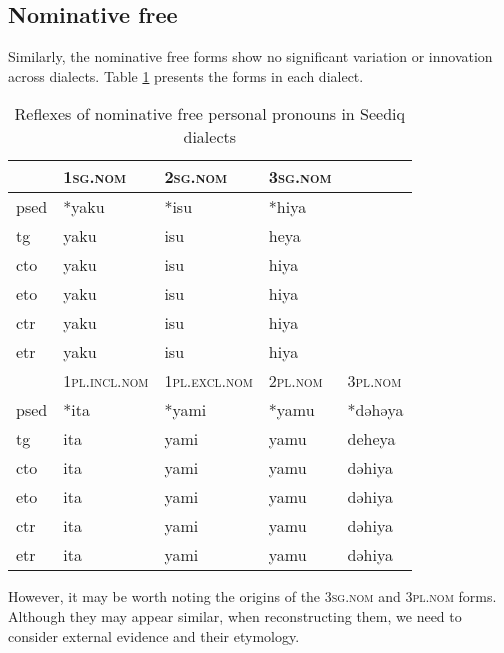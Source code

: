 \subsection{Nominative free}

Similarly, the nominative free forms show no significant variation or innovation across dialects. Table \ref{tab:nomfree} presents the forms in each dialect.

\begin{table}[!htbp]
\centering
\caption{Reflexes of nominative free personal pronouns in Seediq dialects}
\label{tab:nomfree}
\begin{tabular}{lllll}
\hline
      & \textsc{1sg.nom}      & \textsc{2sg.nom}      & \textsc{3sg.nom} &         \\ \hline
\acs{psed} & *yaku        & *isu         & *hiya   &         \\
\acs{tg}  & yaku         & isu          & heya    &         \\
\acs{cto}  & yaku         & isu          & hiya    &         \\
\acs{eto}  & yaku         & isu          & hiya    &         \\
\acs{ctr} & yaku         & isu          & hiya    &         \\
\acs{etr} & yaku         & isu          & hiya    &         \\ \hline
      & \textsc{1pl.incl.nom} & \textsc{1pl.excl.nom} & \textsc{2pl.nom} & \textsc{3pl.nom} \\ \hline
\acs{psed} & *ita         & *yami        & *yamu   & *dəhəya \\
\acs{tg}  & ita          & yami         & yamu    & deheya  \\
\acs{cto}  & ita          & yami         & yamu    & dəhiya  \\
\acs{eto}  & ita          & yami         & yamu    & dəhiya  \\
\acs{ctr} & ita          & yami         & yamu    & dəhiya  \\
\acs{etr} & ita          & yami         & yamu    & dəhiya  \\ \hline
\end{tabular}
\end{table}

However, it may be worth noting the origins of the \textsc{3sg.nom} and \textsc{3pl.nom} forms. Although they may appear similar, when reconstructing them, we need to consider external evidence and their etymology.


